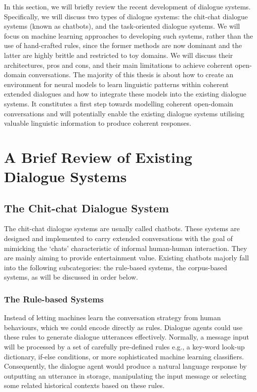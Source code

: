 \documentclass[bsc,frontabs,twoside,singlespacing,parskip,deptreport]{infthesis}     %
\begin{document}
In this section, we will briefly review the recent development of dialogue systems. Specifically, we will discuss two types of dialogue systems: the chit-chat dialogue systems (known as chatbots), and the task-oriented dialogue systems. We will focus on machine learning approaches to developing such systems, rather than the use of hand-crafted rules, since the former methods are now dominant and the latter are highly brittle and restricted to toy domains. We will discuss their architectures, pros and cons, and their main limitations to achieve coherent open-domain conversations. The majority of this thesis is about how to create an environment for neural models to learn linguistic patterns within coherent extended dialogues and how to integrate these models into the existing dialogue systems. It constitutes a first step towards modelling coherent open-domain conversations and will potentially enable the existing dialogue systems utilising valuable linguistic information to produce coherent responses.

\section {A Brief Review of Existing Dialogue Systems}

\subsection{The Chit-chat Dialogue System}

The chit-chat dialogue systems are usually called chatbots. These systems are designed and implemented to carry extended conversations with the goal of mimicking the ‘chats’ characteristic of informal human-human interaction\cite{jurafsky2019speech}. They are mainly aiming to provide entertainment value. Existing chatbots majorly fall into the following subcategories: the rule-based systems, the corpus-based systems, as will be discussed in order below.

\subsubsection*{The Rule-based Systems}

Instead of letting machines learn the conversation strategy from human behaviours, which we could encode directly as rules. Dialogue agents could use these rules to generate dialogue utterances effectively. Normally, a message input will be processed by a set of carefully pre-defined rules e.g., a key-word look-up dictionary, if-else conditions, or more sophisticated machine learning classifiers\cite{jiweilithesis}. Consequently, the dialogue agent would produce a natural language response by outputting an utterance in storage, manipulating the input message or selecting some related historical contexts based on these rules.
\end{document}
